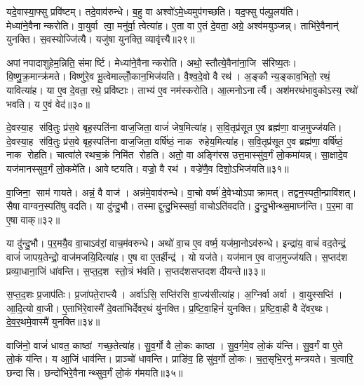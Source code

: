 यदे॒वास्या॒फ्सु प्रवि॑ष्टम्। तदे॒वाव॑रुन्धे। ब॒हु वा अश्वो॑ऽमे॒ध्यमुप॑गच्छति। यद॒फ्सु प॑ल्पू॒लय॑ति। मेध्या॑ने॒वैनान्करोति। वा॒युर्वा त्वा॒ मनु॑र्वा॒ त्वेत्या॑ह। ए॒ता वा ए॒तं दे॒वता॒ अग्रे॒ अश्व॑मयुञ्जन्न्। ताभि॑रे॒वैनान्॑ युनक्ति। स॒वस्योज्जि॑त्यै। यजु॑षा युनक्ति॒ व्यावृ॑त्त्यै॥२९॥

अपांनपादाशुहेम॒न्निति॒ संमार्ष्टि। मेध्या॑ने॒वैनान्करोति। अथो॒ स्तौत्ये॒वैना॑ना॒जि स॑रिष्य॒तः। वि॒ष्णु॒क्र॒मान्क्र॑मते। विष्णु॑रे॒व भू॒त्वेमाल्लोँ॒कान॒भिज॑यति। वै॒श्व॒दे॒वो वै रथ॑। अ॒ङ्कौ न्य॒ङ्काव॒भितो॒ रथं॒ यावित्या॑ह। या ए॒व दे॒वता॒ रथे॒ प्रवि॑ष्टाः। ताभ्य॑ ए॒व नम॑स्करोति। आ॒त्मनोऽनार्त्यै। अश॑मरथंभावुकोऽस्य॒ रथो॑ भवति। य ए॒वं वेद॑॥३०॥\anuvakamend[स्व॒द॒य॒ति॒ प॒ल्पू॒लय॑ति॒ व्यावृ॑त्त्या॒ अनार्त्यै॒ द्वे च॑]

दे॒वस्या॒ह स॑वि॒तुः प्र॑स॒वे बृह॒स्पति॑ना वाज॒जिता॒ वाजं॑ जेष॒मित्या॑ह। स॒वि॒तृप्र॑सूत ए॒व ब्रह्म॑णा॒ वाज॒मुज्ज॑यति। दे॒वस्या॒ह स॑वि॒तुः प्र॑स॒वे बृह॒स्पति॑ना वाज॒जिता॒ वर्\mbox{}षि॑ष्ठं॒ नाक रुहेय॒मित्या॑ह। स॒वि॒तृप्र॑सूत ए॒व ब्रह्म॑णा॒ वर्\mbox{}षि॑ष्ठं॒ नाक रोहति। चात्वा॑ले रथच॒क्रं निमि॑त रोहति। अतो॒ वा अङ्गि॑रस उत्त॒मास्सु॑व॒र्गं लो॒कमा॑यन्न्। सा॒क्षादे॒व यज॑मानस्सुव॒र्गं लो॒कमे॑ति। आवेष्टयति। वज्रो॒ वै रथ॑। वज्रे॑णै॒व दिशो॒ऽभिज॑यति॥३१॥

वा॒जिना॒ साम॑ गायते। अन्नं॒ वै वाज॑। अन्न॑मे॒वाव॑रुन्धे। वा॒चो वर्ष्म॑ दे॒वेभ्योऽपाक्रामत्। तद्वन॒स्पती॒न्प्रावि॑शत्। सैषा वाग्वन॒स्पति॑षु वदति। या दु॑न्दु॒भौ। तस्माद्दुन्दु॒भिस्सर्वा॒ वाचोऽति॑वदति। दु॒न्दु॒भीन्थ्स॒माघ्न॑न्ति। प॒र॒मा वा ए॒षा वाक्॥३२॥

या दु॑न्दु॒भौ। प॒र॒मयै॒व वा॒चाऽव॑रां॒ वाच॒म॑वरुन्धे। अथो॑ वा॒च ए॒व वर्ष्म॒ यज॑मा॒नोऽव॑रुन्धे। इन्द्रा॑य॒ वाचं॑ वद॒तेन्द्रं॒ वाजं॑ जापय॒तेन्द्रो॒ वाज॑मजयि॒दित्या॑ह। ए॒ष वा ए॒तर्\mbox{}हीन्द्र॑। यो यज॑ते। यज॑मान ए॒व वाज॒मुज्ज॑यति। स॒प्तद॑श प्रव्या॒धाना॒जिं धा॑वन्ति। स॒प्त॒द॒श स्तो॒त्रं भ॑वति। स॒प्तद॑शसप्तदश दीयन्ते॥३३॥

स॒प्त॒द॒शः प्र॒जाप॑तिः। प्र॒जा॑पते॒राप्त्यै। अर्वा॑ऽसि॒ सप्ति॑रसि वा॒ज्य॑सीत्या॑ह। अ॒ग्निर्वा अर्वा। वा॒युस्सप्ति॑। आ॒दि॒त्यो वा॒जी। ए॒ताभि॑रे॒वास्मै॑ दे॒वता॑भिर्देवर॒थं यु॑नक्ति। प्र॒ष्टि॒वा॒हिनं॑ युनक्ति। प्र॒ष्टि॒वा॒ही वै दे॑वर॒थः। दे॒व॒र॒थमे॒वास्मै॑ युनक्ति॥३४॥

वाजि॑नो॒ वाजं॑ धावत॒ काष्ठां गच्छ॒तेत्या॑ह। सु॒व॒र्गो वै लो॒कः काष्ठा। सु॒व॒र्गमे॒व लो॒कं य॑न्ति। सु॒व॒र्गं वा ए॒ते लो॒कं य॑न्ति। य आ॒जिं धाव॑न्ति। प्राञ्चो॑ धावन्ति। प्राङि॑व॒ हि सु॑व॒र्गो लो॒कः। च॒त॒सृभि॒रनु॑ मन्त्रयते। च॒त्वारि॒ छन्दासि। छन्दो॑भिरे॒वैनान्थ्सुव॒र्गं लो॒कं ग॑मयति॥३५॥

